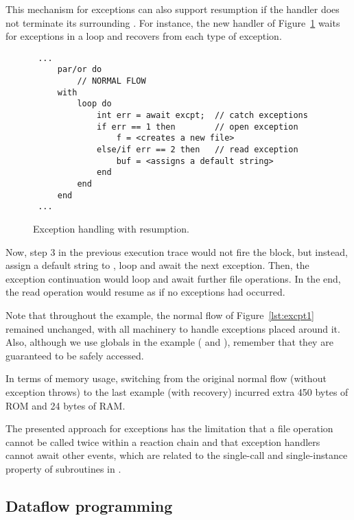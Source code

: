 This mechanism for exceptions can also support resumption if the handler does 
not terminate its surrounding .
For instance, the new handler of Figure~\ref{lst:excpt3} waits for exceptions 
in a loop and recovers from each type of exception.

\begin{figure}[t]
{\small
\begin{verbatim}
 ...
     par/or do
         // NORMAL FLOW
     with
         loop do
             int err = await excpt;  // catch exceptions
             if err == 1 then        // open exception
                 f = <creates a new file>
             else/if err == 2 then   // read exception
                 buf = <assigns a default string>
             end
         end
     end
 ...
\end{verbatim}
}%
\caption{ Exception handling with resumption.
\label{lst:excpt3}
}
\end{figure}

Now, step 3 in the previous execution trace would not fire the \FIN block, but 
instead, assign a default string to , loop and await the next 
exception.
Then, the exception continuation would loop and await further file operations.
In the end, the read operation would resume as if no exceptions had occurred.

Note that throughout the example, the normal flow of Figure~\ref{lst:excpt1} 
remained unchanged, with all machinery to handle exceptions placed around it.
Also, although we use globals in the example ( and ), 
remember that they are guaranteed to be safely accessed.

In terms of memory usage, switching from the original normal flow (without 
exception throws) to the last example (with recovery) incurred extra 450 bytes 
of ROM and 24 bytes of RAM.

The presented approach for exceptions has the limitation that a file operation 
cannot be called twice within a reaction chain and that exception handlers 
cannot await other events, which are related to the single-call and 
single-instance property of subroutines in \CEU.

\subsection{Dataflow programming}
\label{sec.adv.frp}

